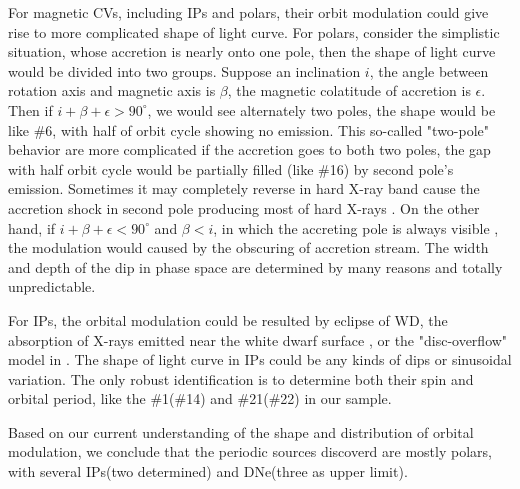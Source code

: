 \documentclass[twoside,twocolumn]{aastex63}
\begin{document}
For magnetic CVs, including IPs and polars, their orbit modulation could give rise to more complicated shape of light curve. For polars, consider the simplistic situation, whose accretion is nearly onto one pole, then the shape of light curve would be divided into two groups. Suppose an inclination $i$, the angle between rotation axis and magnetic axis is $\beta$, the magnetic colatitude of accretion is $\epsilon$. Then if $i+\beta+\epsilon > 90^{\circ}$, we would see alternately two poles, the shape would be like \#6, with half of orbit cycle showing no emission. This so-called "two-pole"  behavior are more complicated if the accretion goes to both two poles, the gap with half orbit cycle would be partially filled (like \#16) by second pole's emission. Sometimes it may completely reverse in hard X-ray band cause the accretion shock in second pole producing most of hard X-rays \citep{1985A&A...148L..14H}. On the other hand, if $i+\beta+\epsilon < 90^{\circ}$ and $\beta < i$, in which the accreting pole is always visible , the modulation would caused by the obscuring of accretion stream. The width and depth of the dip in phase space are determined by many reasons and totally unpredictable. 

For IPs, the orbital modulation could be resulted by eclipse of WD, the absorption of X-rays emitted near the white
dwarf surface \citep{1993MNRAS.260..299H}, or the "disc-overflow" model in \citep{1996MNRAS.280..937N}. The shape of light curve in IPs could be any kinds of dips or sinusoidal variation. The only robust identification is to determine both their spin and orbital period, like the \#1(\#14) and \#21(\#22) in our sample.

Based on our current understanding of the shape and distribution of orbital modulation, we conclude that the periodic sources discoverd are mostly polars, with several IPs(two determined) and DNe(three as upper limit). 
\end{document}
